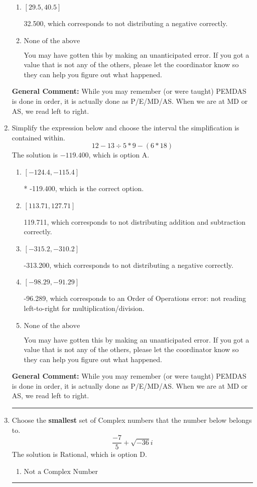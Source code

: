 \documentclass{extbook}[14pt]
\newcommand{\litem}[1]{\item #1

\rule{\textwidth}{0.4pt}}
\begin{document}
\begin{enumerate}
{\begin{enumerate}[label=\Alph*.]
 -201.022, which corresponds to an Order of Operations error: not reading left-to-right for multiplication/division.
\item \( [29.5, 40.5] \)

 32.500, which corresponds to not distributing a negative correctly.
\item \( \text{None of the above} \)

 You may have gotten this by making an unanticipated error. If you got a value that is not any of the others, please let the coordinator know so they can help you figure out what happened.
\end{enumerate}

\textbf{General Comment:} While you may remember (or were taught) PEMDAS is done in order, it is actually done as P/E/MD/AS. When we are at MD or AS, we read left to right.
}
\litem{
Simplify the expression below and choose the interval the simplification is contained within.
\[ 12 - 13 \div 5 * 9 - (6 * 18) \]The solution is \( -119.400 \), which is option A.\begin{enumerate}[label=\Alph*.]
\item \( [-124.4, -115.4] \)

* -119.400, which is the correct option.
\item \( [113.71, 127.71] \)

 119.711, which corresponds to not distributing addition and subtraction correctly.
\item \( [-315.2, -310.2] \)

 -313.200, which corresponds to not distributing a negative correctly.
\item \( [-98.29, -91.29] \)

 -96.289, which corresponds to an Order of Operations error: not reading left-to-right for multiplication/division.
\item \( \text{None of the above} \)

 You may have gotten this by making an unanticipated error. If you got a value that is not any of the others, please let the coordinator know so they can help you figure out what happened.
\end{enumerate}

\textbf{General Comment:} While you may remember (or were taught) PEMDAS is done in order, it is actually done as P/E/MD/AS. When we are at MD or AS, we read left to right.
}
\litem{
Choose the \textbf{smallest} set of Complex numbers that the number below belongs to.
\[ \frac{-7}{5}+\sqrt{-36}i \]The solution is \( \text{Rational} \), which is option D.\begin{enumerate}[label=\Alph*.]
\item \( \text{Not a Complex Number} \)


\end{enumerate}}
\end{enumerate}
\end{document}
